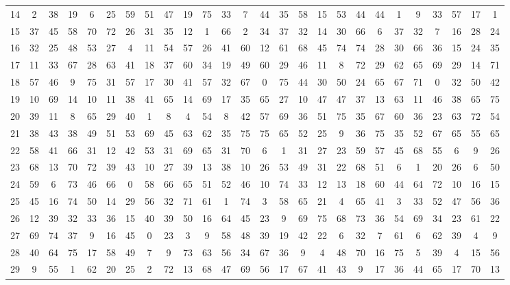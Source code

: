 \begin{table}
\begin{tabular}{c c c c c c c c c c c c c c c c c c c c c c c c c c }
14 & 2 & 38 & 19 & 6 & 25 & 59 & 51 & 47 & 19 & 75 & 33 & 7 & 44 & 35 & 58 & 15 & 53 & 44 & 44 & 1 & 9 & 33 & 57 & 17 & 1 \\
15 & 37 & 45 & 58 & 70 & 72 & 26 & 31 & 35 & 12 & 1 & 66 & 2 & 34 & 37 & 32 & 14 & 30 & 66 & 6 & 37 & 32 & 7 & 16 & 28 & 24 \\
16 & 32 & 25 & 48 & 53 & 27 & 4 & 11 & 54 & 57 & 26 & 41 & 60 & 12 & 61 & 68 & 45 & 74 & 74 & 28 & 30 & 66 & 36 & 15 & 24 & 35 \\
17 & 11 & 33 & 67 & 28 & 63 & 41 & 18 & 37 & 60 & 34 & 19 & 49 & 60 & 29 & 46 & 11 & 8 & 72 & 29 & 62 & 65 & 69 & 29 & 14 & 71 \\
18 & 57 & 46 & 9 & 75 & 31 & 57 & 17 & 30 & 41 & 57 & 32 & 67 & 0 & 75 & 44 & 30 & 50 & 24 & 65 & 67 & 71 & 0 & 32 & 50 & 42 \\
19 & 10 & 69 & 14 & 10 & 11 & 38 & 41 & 65 & 14 & 69 & 17 & 35 & 65 & 27 & 10 & 47 & 47 & 37 & 13 & 63 & 11 & 46 & 38 & 65 & 75 \\
20 & 39 & 11 & 8 & 65 & 29 & 40 & 1 & 8 & 4 & 54 & 8 & 42 & 57 & 69 & 36 & 51 & 75 & 35 & 67 & 60 & 36 & 23 & 63 & 72 & 54 \\
21 & 38 & 43 & 38 & 49 & 51 & 53 & 69 & 45 & 63 & 62 & 35 & 75 & 75 & 65 & 52 & 25 & 9 & 36 & 75 & 35 & 52 & 67 & 65 & 55 & 65 \\
22 & 58 & 41 & 66 & 31 & 12 & 42 & 53 & 31 & 69 & 65 & 31 & 70 & 6 & 1 & 31 & 27 & 23 & 59 & 57 & 45 & 68 & 55 & 6 & 9 & 26 \\
23 & 68 & 13 & 70 & 72 & 39 & 43 & 10 & 27 & 39 & 13 & 38 & 10 & 26 & 53 & 49 & 31 & 22 & 68 & 51 & 6 & 1 & 20 & 26 & 6 & 50 \\
24 & 59 & 6 & 73 & 46 & 66 & 0 & 58 & 66 & 65 & 51 & 52 & 46 & 10 & 74 & 33 & 12 & 13 & 18 & 60 & 44 & 64 & 72 & 10 & 16 & 15 \\
25 & 45 & 16 & 74 & 50 & 14 & 29 & 56 & 32 & 71 & 61 & 1 & 74 & 3 & 58 & 65 & 21 & 4 & 65 & 41 & 3 & 33 & 52 & 47 & 56 & 36 \\
26 & 12 & 39 & 32 & 33 & 36 & 15 & 40 & 39 & 50 & 16 & 64 & 45 & 23 & 9 & 69 & 75 & 68 & 73 & 36 & 54 & 69 & 34 & 23 & 61 & 22 \\
27 & 69 & 74 & 37 & 9 & 16 & 45 & 0 & 23 & 3 & 9 & 58 & 48 & 39 & 19 & 42 & 22 & 6 & 32 & 7 & 61 & 6 & 62 & 39 & 4 & 9 \\
28 & 40 & 64 & 75 & 17 & 58 & 49 & 7 & 9 & 73 & 63 & 56 & 34 & 67 & 36 & 9 & 4 & 48 & 70 & 16 & 75 & 5 & 39 & 4 & 15 & 56 \\
29 & 9 & 55 & 1 & 62 & 20 & 25 & 2 & 72 & 13 & 68 & 47 & 69 & 56 & 17 & 67 & 41 & 43 & 9 & 17 & 36 & 44 & 65 & 17 & 70 & 13 \\

\end{tabular}
\end{table}
